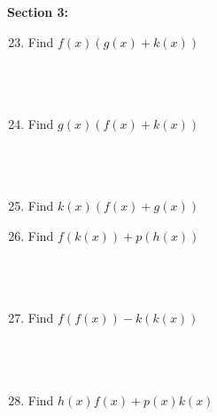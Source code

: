 \documentclass{article}
\begin{document}
\vspace{4cm}
\noindent
\textbf{Section 3:}
\\
\begin{minipage}[t]{0.45\textwidth}
    \begin{enumerate}
        \setcounter{enumi}{22}
        \item Find $f(x)(g(x)+k(x))$
        \\\\\\\\
        \item Find $g(x)(f(x)+k(x))$
        \\\\\\\\
        \item Find $k(x)(f(x)+g(x))$
        
        
    \end{enumerate}
\end{minipage}%
\hfill
\begin{minipage}[t]{0.45\textwidth}
    \begin{enumerate}
        \setcounter{enumi}{25} %
        \item Find $f(k(x)) + p(h(x))$
        \\\\\\\\
        \item Find $f(f(x)) - k(k(x))$
        \\\\\\\\
        \item Find $h(x)f(x) + p(x)k(x)$
        
        
    \end{enumerate}
\end{minipage}
\end{document}
